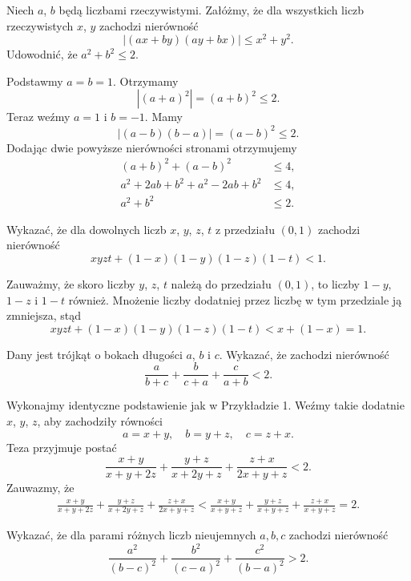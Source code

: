 \newpage
{}
\begin{problem}{1}
	Niech $a$, $b$ będą liczbami rzeczywistymi. Załóżmy, że dla wszystkich liczb rzeczywistych $x$, $y$ zachodzi nierówność
	\[
		|(ax + by)(ay + bx)| \leqslant x^2 + y^2.
	\]
	Udowodnić, że $a^2 + b^2 \leqslant 2$.
\end{problem}

\noindent
Podstawmy $a = b = 1$. Otrzymamy
\[
	|(a + a)^2| = (a + b)^2 \leqslant 2.
\]
Teraz weźmy $a = 1$ i $b = -1$. Mamy
\[
	|(a - b)(b - a)| = (a - b)^2 \leqslant 2.
\]
Dodając dwie powyższe nierówności stronami otrzymujemy
\begin{align*}
	(a + b)^2 + (a - b)^2 &\leqslant 4, \\
	a^2 + 2ab + b^2 + a^2 - 2ab + b^2 &\leqslant 4, \\
	a^2 + b^2 &\leqslant 2.
\end{align*}

\begin{problem}{2}
Wykazać, że dla dowolnych liczb $x$, $y$, $z$, $t$ z przedziału $(0, 1)$ zachodzi nierówność
\[
	xyzt + (1 - x)(1 - y)(1 - z)(1 - t) < 1.
\]
\end{problem}

\noindent
Zauważmy, że skoro liczby $y$, $z$, $t$ należą do przedziału $(0, 1)$, to liczby $1 - y$, $1 - z$ i $1 - t$ również. Mnożenie liczby dodatniej przez liczbę w tym przedziale ją zmniejsza, stąd
\[
	xyzt + (1 - x)(1 - y)(1 - z)(1 - t) < x + (1 - x) = 1.
\]

\begin{problem}{3}
Dany jest trójkąt o bokach długości $a$, $b$ i $c$. Wykazać, że zachodzi nierówność
\[
	\frac{a}{b + c} + \frac{b}{c + a} + \frac{c}{a + b} < 2.
\]
\end{problem}

\noindent
Wykonajmy identyczne podstawienie jak w Przykładzie 1. Weźmy takie dodatnie $x$, $y$, $z$, aby zachodziły równości
\[
	a = x + y, \quad b = y + z, \quad c = z + x.
\]
Teza przyjmuje postać
\[
	\frac{x + y}{x + y + 2z} + \frac{y + z}{x + 2y + z} + \frac{z + x}{2x + y + z} < 2.
\]
Zauwazmy, że
\begin{align*}
	\frac{x + y}{x + y + 2z} + \frac{y + z}{x + 2y + z} + \frac{z + x}{2x + y + z} < \frac{x + y}{x + y + z} + \frac{y + z}{x + y + z} + \frac{z + x}{x + y + z} =2.
\end{align*}

\begin{problem}{4}
Wykazać, że dla parami różnych liczb nieujemnych $a,b,c$ zachodzi nierówność
\[
	\frac{a^2}{(b - c)^2} + \frac{b^2}{(c - a)^2} + \frac{c^2}{(b - a)^2} > 2.
\]
\end{problem}

